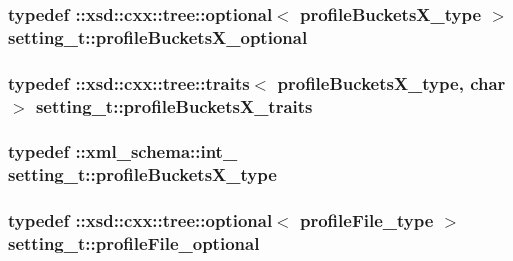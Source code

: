 \subsubsection[{\texorpdfstring{profile\+Buckets\+X\+\_\+optional}{profileBucketsX_optional}}]{\setlength{\rightskip}{0pt plus 5cm}typedef \+::xsd\+::cxx\+::tree\+::optional$<$ {\bf profile\+Buckets\+X\+\_\+type} $>$ {\bf setting\+\_\+t\+::profile\+Buckets\+X\+\_\+optional}}\hypertarget{classsetting__t_abe44e9ac5bfb035f396dc36d8a9831d6}{}\label{classsetting__t_abe44e9ac5bfb035f396dc36d8a9831d6}
\subsubsection[{\texorpdfstring{profile\+Buckets\+X\+\_\+traits}{profileBucketsX_traits}}]{\setlength{\rightskip}{0pt plus 5cm}typedef \+::xsd\+::cxx\+::tree\+::traits$<$ {\bf profile\+Buckets\+X\+\_\+type}, char $>$ {\bf setting\+\_\+t\+::profile\+Buckets\+X\+\_\+traits}}\hypertarget{classsetting__t_a2c2047f66bf736cf0d85fe515c715427}{}\label{classsetting__t_a2c2047f66bf736cf0d85fe515c715427}
\subsubsection[{\texorpdfstring{profile\+Buckets\+X\+\_\+type}{profileBucketsX_type}}]{\setlength{\rightskip}{0pt plus 5cm}typedef \+::{\bf xml\+\_\+schema\+::int\+\_\+} {\bf setting\+\_\+t\+::profile\+Buckets\+X\+\_\+type}}\hypertarget{classsetting__t_a424aba4ecbd3f03a202ef656303091a3}{}\label{classsetting__t_a424aba4ecbd3f03a202ef656303091a3}
\subsubsection[{\texorpdfstring{profile\+File\+\_\+optional}{profileFile_optional}}]{\setlength{\rightskip}{0pt plus 5cm}typedef \+::xsd\+::cxx\+::tree\+::optional$<$ {\bf profile\+File\+\_\+type} $>$ {\bf setting\+\_\+t\+::profile\+File\+\_\+optional}}\hypertarget{classsetting__t_a9fc7a23427369cf0af6e4521b9e88d64}{}\label{classsetting__t_a9fc7a23427369cf0af6e4521b9e88d64}
